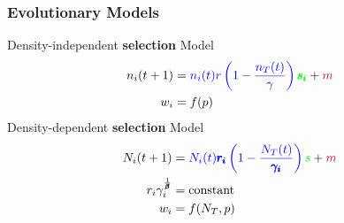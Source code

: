 \documentclass{beamer}
\begin{document}
\begin{frame}
\frametitle{Evolutionary Models}
Density-independent \textbf{selection} Model
\begin{equation*}
\begin{aligned}
n_i(t+1)&=\begingroup\color{blue}n_i(t)r\left(1-\frac{n_T(t)}{\gamma}\right)\endgroup \begingroup\color{green}\pmb{s_i}\endgroup+\color{purple}m\\
w_i&=f(p)
\end{aligned}
\end{equation*}
Density-dependent \textbf{selection} Model
\begin{equation*}
\begin{aligned}
N_i(t+1)&=\begingroup\color{blue}N_i(t)\pmb{r_i}\left(1-\frac{N_T(t)}{\pmb{\gamma_i}}\right)\endgroup \begingroup\color{green}s\endgroup+\begingroup\color{purple}m\endgroup\\
r_i\gamma_i^\frac{1}{\pmb\beta}&=\text{constant}\\
w_i&=f(N_T,p)
\end{aligned}
\end{equation*}
\end{frame}
\end{document}
